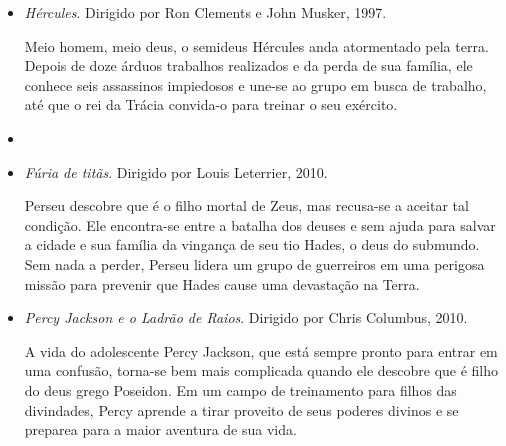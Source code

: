 \documentclass[11pt]{extarticle}
\begin{document}
\begin{itemize}
\item \textit{Hércules}. Dirigido por Ron Clements e John Musker, 1997.

Meio homem, meio deus, o semideus Hércules anda atormentado pela terra. Depois de doze árduos trabalhos realizados e da perda de sua família, ele conhece seis assassinos impiedosos e une-se ao grupo em busca de trabalho, até que o rei da Trácia convida-o para treinar o seu exército.

\item \item \textit{Fúria de titãs}. Dirigido por Louis Leterrier, 2010.

Perseu descobre que é o filho mortal de Zeus, mas recusa-se a aceitar tal condição. Ele encontra-se entre a batalha dos deuses e sem ajuda para salvar a cidade e sua família da vingança de seu tio Hades, o deus do submundo. Sem nada a perder, Perseu lidera um grupo de guerreiros em uma perigosa missão para prevenir que Hades cause uma devastação na Terra.

\item \textit{Percy Jackson e o Ladrão de Raios}. Dirigido por Chris Columbus, 2010.

A vida do adolescente Percy Jackson, que está sempre pronto para entrar em uma confusão, torna-se bem mais complicada quando ele descobre que é filho do deus grego Poseidon. Em um campo de treinamento para filhos das divindades, Percy aprende a tirar proveito de seus poderes divinos e se preparea para a maior aventura de sua vida.

\end{itemize}
\end{document}
